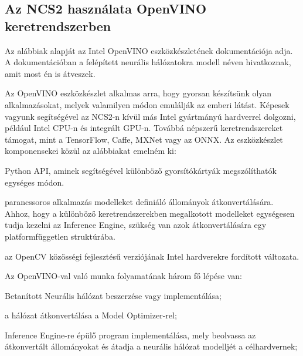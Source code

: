 \subsection{Az NCS2 használata OpenVINO keretrendszerben}
Az alábbiak alapját az Intel OpenVINO eszközkészletének dokumentációja adja.\cite{web:OpenVINO} A dokumentációban a felépített neurális hálózatokra modell néven hivatkoznak, amit most én is átveszek.

Az OpenVINO eszközkészlet alkalmas arra, hogy gyorsan készítsünk olyan alkalmazásokat, melyek valamilyen módon emulálják az emberi látást. Képesek vagyunk segítségével az NCS2-n kívül más Intel gyártmányú hardverrel dolgozni, például Intel CPU-n és integrált GPU-n. Továbbá népszerű keretrendszereket támogat, mint a TensorFlow, Caffe, MXNet vagy az ONNX. Az eszközkészlet komponensekei közül az alábbiakat emelném ki:
\begin{description}[noitemsep]
	\item[Inference Engine] Python API, aminek segítségével különböző gyorsítókártyák megszólíthatók egységes módon.
	\item[Model Optimizer] parancssoros alkalmazás modelleket definiáló állományok átkonvertálására. Ahhoz, hogy a különböző keretrendszerekben megalkotott modelleket egységesen tudja kezelni az Inference Engine, szükség van azok átkonvertálására egy platformfüggetlen struktúrába.
	\item[OpenCV] az OpenCV közösségi fejlesztésű verziójának Intel hardverekre fordított változata.
\end{description}

Az OpenVINO-val való munka folyamatának három fő lépése van:
\begin{enumerate*}[label={}, font=\bfseries]
	\item Betanított Neurális hálózat beszerzése vagy implementálása;
	\item a hálózat átkonvertálása a Model Optimizer-rel;
	\item Inference Engine-re épülő program implementálása, mely beolvassa az átkonvertált állományokat és átadja a neurális hálózat modelljét a célhardvernek;
\end{enumerate*}

